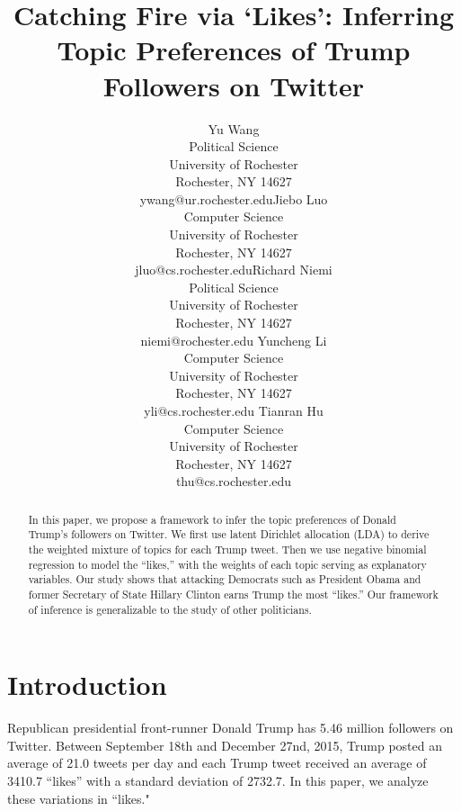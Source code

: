 \documentclass[letterpaper]{article}
\title{\TitleFont Catching Fire via `Likes': Inferring Topic Preferences of Trump Followers on Twitter}
\begin{document}
\author{Yu Wang\\Political Science\\University of Rochester\\Rochester, NY 14627\\ywang@ur.rochester.edu\And Jiebo Luo\\Computer Science\\University of Rochester\\Rochester, NY 14627\\jluo@cs.rochester.edu\And Richard Niemi\\Political Science\\University of Rochester\\Rochester, NY 14627\\niemi@rochester.edu \And Yuncheng Li\\Computer Science\\University of Rochester\\Rochester, NY 14627\\yli@cs.rochester.edu \And Tianran Hu\\Computer Science\\University of Rochester\\Rochester, NY 14627\\thu@cs.rochester.edu}


\maketitle

\begin{abstract} \small\baselineskip=9pt 
In this paper, we propose a framework to infer the topic preferences of Donald Trump's followers on Twitter. We first use latent Dirichlet allocation (LDA) to derive the weighted mixture of topics for each Trump tweet. Then we use negative binomial regression to model the ``likes,'' with the weights of each topic serving as explanatory variables. Our study shows that attacking Democrats such as President Obama and former Secretary of State Hillary Clinton earns Trump the most ``likes.'' Our framework of inference is generalizable to the study of other politicians.

\end{abstract}

\section{Introduction} 
Republican presidential front-runner Donald Trump has 5.46 million followers on Twitter. Between September 18th and December 27nd, 2015, Trump posted an average of 21.0 tweets per day and each Trump tweet received an average of 3410.7 ``likes'' with a standard deviation of 2732.7. In this paper, we analyze these variations in ``likes."
\end{document}
